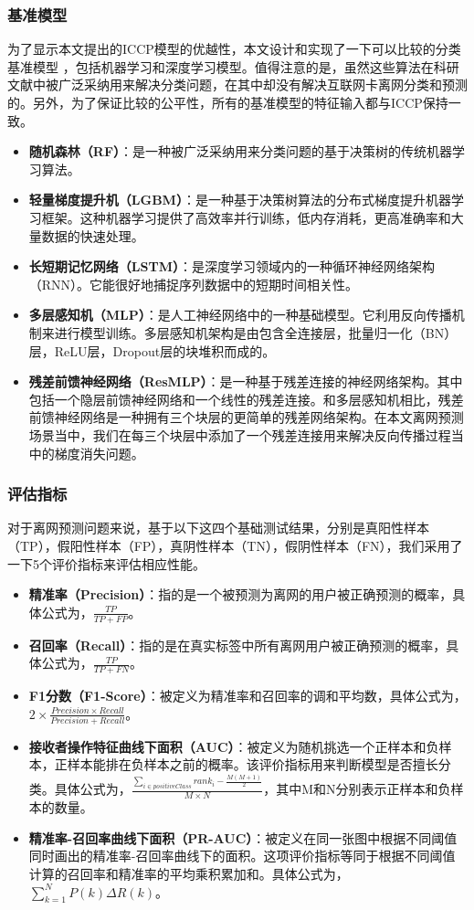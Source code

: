 \subsubsection{基准模型}
为了显示本文提出的ICCP模型的优越性，本文设计和实现了一下可以比较的分类基准模型 ，包括机器学习和深度学习模型。值得注意的是，虽然这些算法在科研文献中被广泛采纳用来解决分类问题，在其中却没有解决互联网卡离网分类和预测的。另外，为了保证比较的公平性，所有的基准模型的特征输入都与ICCP保持一致。
\begin{itemize}
	\item \textbf{随机森林（RF）}：是一种被广泛采纳用来分类问题的基于决策树的传统机器学习算法。
	\item \textbf{轻量梯度提升机（LGBM）}：是一种基于决策树算法的分布式梯度提升机器学习框架。这种机器学习提供了高效率并行训练，低内存消耗，更高准确率和大量数据的快速处理。
	\item \textbf{长短期记忆网络（LSTM）}：是深度学习领域内的一种循环神经网络架构（RNN）。它能很好地捕捉序列数据中的短期时间相关性。
	\item \textbf{多层感知机（MLP）}：是人工神经网络中的一种基础模型。它利用反向传播机制来进行模型训练。多层感知机架构是由包含全连接层，批量归一化（BN）层，ReLU层，Dropout层的块堆积而成的。
	\item \textbf{残差前馈神经网络（ResMLP）}：是一种基于残差连接的神经网络架构。其中包括一个隐层前馈神经网络和一个线性的残差连接。和多层感知机相比，残差前馈神经网络是一种拥有三个块层的更简单的残差网络架构。在本文离网预测场景当中，我们在每三个块层中添加了一个残差连接用来解决反向传播过程当中的梯度消失问题。
\end{itemize}


\subsubsection{评估指标}
对于离网预测问题来说，基于以下这四个基础测试结果，分别是真阳性样本（TP），假阳性样本（FP），真阴性样本（TN），假阴性样本（FN），我们采用了一下5个评价指标来评估相应性能。
\begin{itemize}
	\item \textbf{精准率（Precision）}：指的是一个被预测为离网的用户被正确预测的概率，具体公式为，$\frac{TP}{TP+FP}$。
	\item \textbf{召回率（Recall）}：指的是在真实标签中所有离网用户被正确预测的概率，具体公式为，$\frac{TP}{TP+FN}$。
	\item \textbf{F1分数（F1-Score）}：被定义为精准率和召回率的调和平均数，具体公式为，$2 \times \frac{Precision \times Recall}{Precision + Recall}$。
	\item \textbf{接收者操作特征曲线下面积（AUC）}：被定义为随机挑选一个正样本和负样本，正样本能排在负样本之前的概率。该评价指标用来判断模型是否擅长分类。具体公式为，$\frac{\sum_{i \in positiveClass}rank_{i} - \frac{M(M+1)}{2}}{M \times N}$，其中M和N分别表示正样本和负样本的数量。
	\item \textbf{精准率-召回率曲线下面积（PR-AUC）}：被定义在同一张图中根据不同阈值同时画出的精准率-召回率曲线下的面积。这项评价指标等同于根据不同阈值计算的召回率和精准率的平均乘积累加和。具体公式为，$\sum_{k=1}^{N}P(k) \Delta
	 R(k)$。
\end{itemize}

